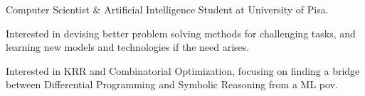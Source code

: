 

\begin{cvparagraph}

Computer Scientist \& Artificial Intelligence Student at University of Pisa.

Interested in devising better problem solving methods for challenging tasks, and learning new models and technologies if the need arises.

Interested in KRR and Combinatorial Optimization, focusing on finding a bridge between Differential Programming and Symbolic Reasoning from a ML pov.

\end{cvparagraph}
